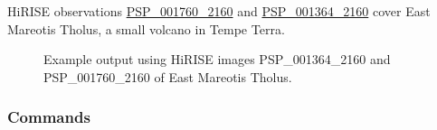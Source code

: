 \ac{HiRISE} observations
\href{http://hirise.lpl.arizona.edu/PSP_001760_2160}{PSP\_001760\_2160} and
\href{http://hirise.lpl.arizona.edu/PSP_001364_2160}{PSP\_001364\_2160} 
cover East Mareotis Tholus, a small volcano in Tempe Terra.

\begin{figure}[h!]
\centering
  \hfil
\caption{Example output using HiRISE images PSP\_001364\_2160 and
  PSP\_001760\_2160 of East Mareotis Tholus.}
\label{fig:hirise_emare_example}
\end{figure}

\subsubsection*{Commands}

